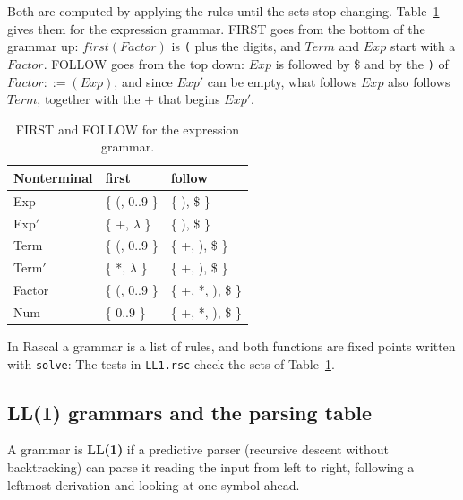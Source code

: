 Both are computed by applying the rules until the sets stop changing.
Table~\ref{tab:first-follow} gives them for the expression grammar. FIRST
goes from the bottom of the grammar up: $\mathit{first}(\mathit{Factor})$ is
\texttt{(} plus the digits, and $\mathit{Term}$ and $\mathit{Exp}$ start with a
$\mathit{Factor}$. FOLLOW goes from the top down: $\mathit{Exp}$ is followed by
\$ and by the \texttt{)} of $\mathit{Factor} ::= (\mathit{Exp})$, and since
$\mathit{Exp'}$ can be empty, what follows $\mathit{Exp}$ also follows $\mathit{Term}$,
together with the $+$ that begins $\mathit{Exp'}$.

\begin{table}[h]
\centering
\small
\begin{tabular}{l l l}
  \toprule
  Nonterminal & first & follow \\
  \midrule
  Exp       & \{ (, 0..9 \}   & \{ ), \$ \} \\
  Exp$'$    & \{ +, $\lambda$ \} & \{ ), \$ \} \\
  Term      & \{ (, 0..9 \}   & \{ +, ), \$ \} \\
  Term$'$   & \{ *, $\lambda$ \} & \{ +, ), \$ \} \\
  Factor    & \{ (, 0..9 \}   & \{ +, *, ), \$ \} \\
  Num       & \{ 0..9 \}      & \{ +, *, ), \$ \} \\
  \bottomrule
\end{tabular}
\caption{FIRST and FOLLOW for the expression grammar.}
\label{tab:first-follow}
\end{table}

In Rascal a grammar is a list of rules, and both functions are fixed points
written with \texttt{solve}:
The tests in \texttt{LL1.rsc} check the sets of Table~\ref{tab:first-follow}.

\subsection{LL(1) grammars and the parsing table}

\begin{definition}
A grammar is \textbf{LL(1)} if a predictive parser (recursive descent without
backtracking) can parse it reading the input from left to right, following a
leftmost derivation and looking at one symbol ahead.
\end{definition}

